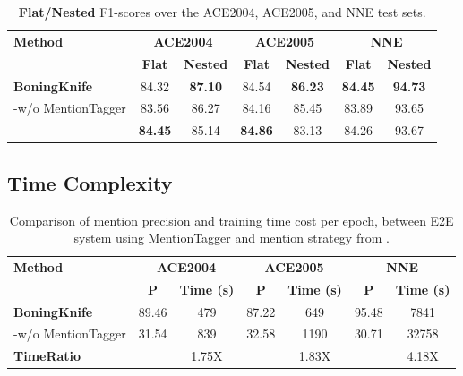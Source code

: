 \documentclass[11pt,a4paper]{article}
\begin{document}







\begin{table}[htbp]
\centering
\vskip 0.1in
\begin{tabular}{@{}l|cc|cc|cc@{}}
\toprule
\multirow{2}{*}{\textbf{Method}} & \multicolumn{2}{c|}{\textbf{ACE2004}} & \multicolumn{2}{c|}{\textbf{ACE2005}} & \multicolumn{2}{c}{\textbf{NNE}} \\ \cmidrule(l){2-7} 
 & \textbf{Flat} & \textbf{Nested} & \textbf{Flat} & \textbf{Nested} & \textbf{Flat} & \textbf{Nested} \\ \midrule
\textbf{BoningKnife} & 84.32 & \textbf{87.10} & 84.54 & \textbf{86.23} & \textbf{84.45} & \textbf{94.73}   \\
-w/o MentionTagger & 83.56 & 86.27 & 84.16 & 85.45 & 83.89 & 93.65 \\
\citet{shibuya2019nested} & \textbf{84.45} & 85.14 & \textbf{84.86} & 83.13 & 84.26 & 93.67  \\
\bottomrule
\end{tabular}\caption{\textbf{Flat/Nested} F1-scores over the ACE2004, ACE2005, and NNE test sets. }
\label{tab:span_result}
\end{table}
 
\subsection{Time Complexity}
\label{sec:time_complexity}

\begin{table}[htbp]
\centering
\vskip 0.1in
\begin{tabular}{@{}l|cc|cc|cc@{}}
\toprule
\multirow{2}{*}{\textbf{Method}} & \multicolumn{2}{c|}{\textbf{ACE2004}} & \multicolumn{2}{c|}{\textbf{ACE2005}} & \multicolumn{2}{c}{\textbf{NNE}} \\ \cmidrule(l){2-7} 
 & \textbf{P} & \textbf{Time (s)} & \textbf{P} & \textbf{Time (s)} & \textbf{P} & \textbf{Time (s)} \\ \midrule
\textbf{BoningKnife} & 89.46 & 479 & 87.22 & 649 & 95.48 & 7841   \\
-w/o MentionTagger   & 31.54 & 839 & 32.58 & 1190 & 30.71 & 32758 \\
\midrule
\textbf{TimeRatio} &  & 1.75X &  & 1.83X & & 4.18X   \\
\bottomrule
\end{tabular}\caption{Comparison of mention precision and training time cost per epoch, between E2E system using MentionTagger and mention strategy from \citet{tan2020boundary}. }
\label{tab:time_compare}
\end{table}
 
\end{document}
